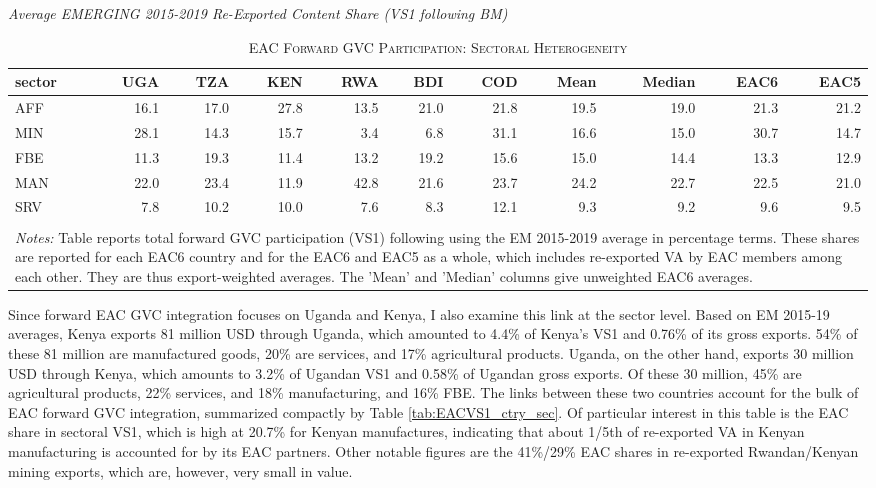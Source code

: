 \documentclass[a4paper]{article}
\begin{document}
\begin{table}[h]  
\centering
\caption{\label{tab:EACVS1_sec}\textsc{EAC Forward GVC Participation: Sectoral Heterogeneity}}
\small{\textit{Average EMERGING 2015-2019 Re-Exported Content Share (VS1 following BM)}} \\
\vspace{1mm}
\begin{tabular}{lrrrrrrrrrr}
  \toprule
sector & UGA & TZA & KEN & RWA & BDI & COD & Mean & Median & EAC6 & EAC5 \\ 
  \midrule
AFF & 16.1 & 17.0 & 27.8 & 13.5 & 21.0 & 21.8 & 19.5 & 19.0 & 21.3 & 21.2\\ 
  MIN & 28.1 & 14.3 & 15.7 & 3.4 & 6.8 & 31.1 & 16.6 & 15.0 & 30.7 & 14.7\\ 
  FBE & 11.3 & 19.3 & 11.4 & 13.2 & 19.2 & 15.6 & 15.0 & 14.4 & 13.3 & 12.9\\ 
  MAN & 22.0 & 23.4 & 11.9 & 42.8 & 21.6 & 23.7 & 24.2 & 22.7 & 22.5 & 21.0\\ 
  SRV & 7.8 & 10.2 & 10.0 & 7.6 & 8.3 & 12.1 & 9.3 & 9.2 & 9.6 & 9.5\\
   \bottomrule \\ [-0.9em]
\multicolumn{11}{l}{\parbox{0.85\textwidth}{\scriptsize
\textit{Notes:} Table reports total forward GVC participation (VS1) following  \citet{borin2019measuring} using the EM 2015-2019 average in percentage terms. These shares are reported for each EAC6 country and for the EAC6 and EAC5 as a whole, which includes re-exported VA by EAC members among each other. They are thus export-weighted averages. The 'Mean' and 'Median' columns give unweighted EAC6 averages.}}
\end{tabular}
\end{table}
\FloatBarrier

Since forward EAC GVC integration focuses on Uganda and Kenya, I also examine this link at the sector level. %
Based on EM 2015-19 averages, Kenya exports 81 million USD through Uganda, which amounted to 4.4\% of Kenya's VS1 and 0.76\% of its gross exports. 54\% of these 81 million are manufactured goods, 20\% are services, and 17\% agricultural products. Uganda, on the other hand, exports 30 million USD through Kenya, which amounts to 3.2\% of Ugandan VS1 and 0.58\% of Ugandan gross exports. Of these 30 million, 45\% are agricultural products, 22\% services, and 18\% manufacturing, and 16\% FBE. The links between these two countries account for the bulk of EAC forward GVC integration, summarized compactly by Table \ref{tab:EACVS1_ctry_sec}. Of particular interest in this table is the EAC share in sectoral VS1, which is high at 20.7\% for Kenyan manufactures, indicating that about 1/5th of re-exported VA in Kenyan manufacturing is accounted for by its EAC partners. Other notable figures are the 41\%/29\% EAC shares in re-exported Rwandan/Kenyan mining exports, which are, however, very small in value. 
\end{document}
